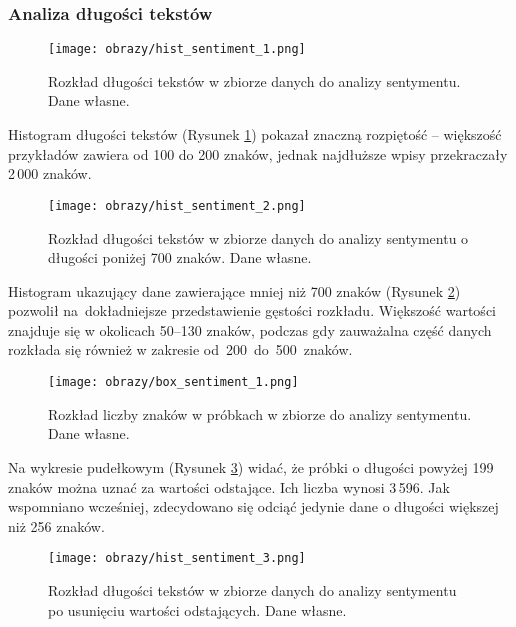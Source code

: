 \subsubsection{Analiza długości tekstów}
\begin{figure}[H]
    \centering
    \texttt{[image: obrazy/hist\_sentiment\_1.png]}
    \caption{Rozkład długości tekstów w zbiorze danych do analizy sentymentu.\\Dane własne.}
    \label{fig:hist-sentiment-1-png}
\end{figure}

Histogram długości tekstów (Rysunek \ref{fig:hist-sentiment-1-png}) pokazał znaczną rozpiętość -- większość przykładów zawiera od 100 do 200 znaków, jednak najdłuższe wpisy przekraczały 2\,000 znaków. 

\begin{figure}[H]
    \centering
    \texttt{[image: obrazy/hist\_sentiment\_2.png]}
    \caption{Rozkład długości tekstów w zbiorze danych do analizy sentymentu o długości poniżej 700 znaków. Dane własne.}
    \label{fig:hist-sentiment-2-png}
\end{figure}

Histogram ukazujący dane zawierające mniej niż 700 znaków (Rysunek \ref{fig:hist-sentiment-2-png}) pozwolił na~dokładniejsze przedstawienie gęstości rozkładu. Większość wartości znajduje się w okolicach 50–130 znaków, podczas gdy zauważalna część danych rozkłada się również w zakresie od~200~do~500~znaków.

\begin{figure}[H]
    \centering
    \texttt{[image: obrazy/box\_sentiment\_1.png]}
    \caption{Rozkład liczby znaków w próbkach w zbiorze do analizy sentymentu.\\Dane własne.}
    \label{fig:box-sentiment-1-png}
\end{figure}

Na wykresie pudełkowym (Rysunek \ref{fig:box-sentiment-1-png}) widać, że próbki o długości powyżej 199 znaków można uznać za wartości odstające. Ich liczba wynosi 3\,596. Jak wspomniano wcześniej, zdecydowano się odciąć jedynie dane o długości większej niż 256 znaków.

\begin{figure}[H]
    \centering
    \texttt{[image: obrazy/hist\_sentiment\_3.png]}
    \caption{Rozkład długości tekstów w zbiorze danych do analizy sentymentu\\po usunięciu wartości odstających. Dane własne.}
    \label{fig:hist-sentiment-3-png}
\end{figure}

